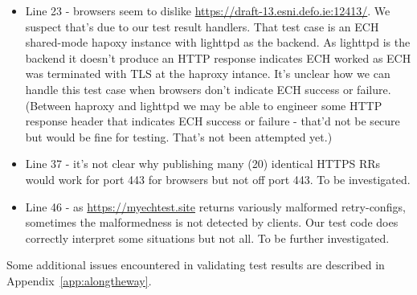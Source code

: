 \begin{itemize}
    \item Line 23 - browsers seem to dislike
        \url{https://draft-13.esni.defo.ie:12413/}.  We suspect that's due to
        our test result handlers. That test case is an ECH shared-mode hapoxy
        instance with lighttpd as the backend. As lighttpd is the backend it
        doesn't produce an HTTP response indicates ECH worked as ECH was
        terminated with TLS at the haproxy intance. It's unclear how we can
        handle this test case when browsers don't indicate ECH success or
        failure. (Between haproxy and lighttpd we may be able to engineer some
        HTTP response header that indicates ECH success or failure - that'd not
        be secure but would be fine for testing. That's not been attempted
        yet.)

    \item Line 37 - it's not clear why publishing many (20) identical HTTPS RRs
        would work for port 443 for browsers but not off port 443. To be
        investigated.

    \item Line 46 - as \url{https://myechtest.site} returns variously malformed
        retry-configs, sometimes the malformedness is not detected by clients.
        Our test code does correctly interpret some situations but not all.
        To be further investigated.

\end{itemize}

Some additional issues encountered in validating test results are described
in Appendix~\ref{app:alongtheway}.

